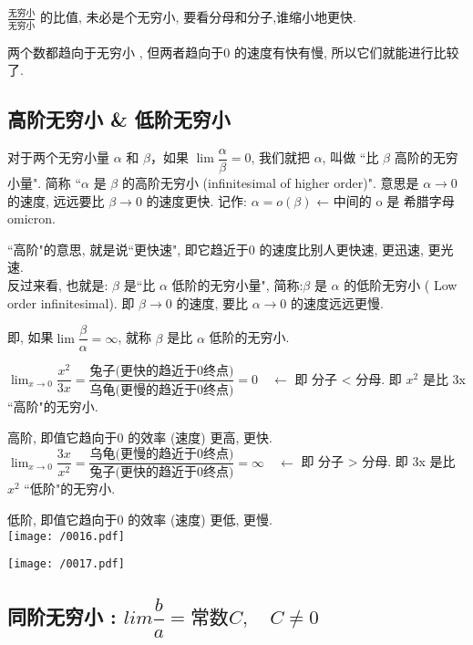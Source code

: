 \documentclass[UTF8]{ctexart}
\begin{document}
$ \frac{\text{无穷小}} {\text{无穷小}}$ 的比值, 未必是个无穷小, 要看分母和分子,谁缩小地更快.  

两个数都趋向于无穷小 , 但两者趋向于0 的速度有快有慢, 所以它们就能进行比较了.




\subsection{ 高阶无穷小 \& 低阶无穷小} 

对于两个无穷小量 $\alpha$ 和 $\beta$，如果 $\lim \dfrac{\alpha} {\beta}=0$, 我们就把  $\alpha$, 叫做 ``比 $\beta$ 高阶的无穷小量". 简称 ``$\alpha$ 是 $\beta$ 的高阶无穷小  (infinitesimal of higher order)".  意思是 $\alpha \to 0$ 的速度, 远远要比 $\beta \to 0$ 的速度更快.  记作: $\alpha = o(\beta)$  ← 中间的 o 是 希腊字母 omicron.

``高阶"的意思, 就是说``更快速", 即它趋近于0 的速度比别人更快速, 更迅速, 更光速. \\

反过来看, 也就是:  $\beta$ 是``比 $\alpha$ 低阶的无穷小量", 简称:$\beta$ 是  $\alpha$ 的低阶无穷小 ( Low order infinitesimal). 即  $\beta \to 0$  的速度, 要比 $\alpha \to 0$  的速度远远更慢.

即, 如果$\lim \dfrac{\beta} {\alpha} = \infty$, 就称 $\beta$ 是比 $\alpha$ 低阶的无穷小.


\begin{myEnvSample}
$ \lim_{x \to 0} \dfrac{x^2} {3x} = \dfrac{\text{兔子(更快的趋近于0终点)}} {\text{乌龟(更慢的趋近于0终点)}} = 0 \quad \gets $   即 分子 < 分母.  即 $x^2$ 是比 3x ``高阶"的无穷小.

高阶, 即值它趋向于0 的效率 (速度) 更高, 更快. \\


$ \lim_{x \to 0} \dfrac{3x} {x^2} = \dfrac{\text{乌龟(更慢的趋近于0终点)}} {\text{兔子(更快的趋近于0终点)}} = \infty \quad \gets $  即 分子 > 分母.  即 3x 是比 $x^2$ ``低阶"的无穷小. 

低阶, 即值它趋向于0 的效率 (速度) 更低, 更慢. \\

\texttt{[image: /0016.pdf]}

\texttt{[image: /0017.pdf]}
\end{myEnvSample}




\subsection{同阶无穷小 : $lim \dfrac{b} {a}= \text{常数}C, \quad C \ne 0$} 
\end{document}
